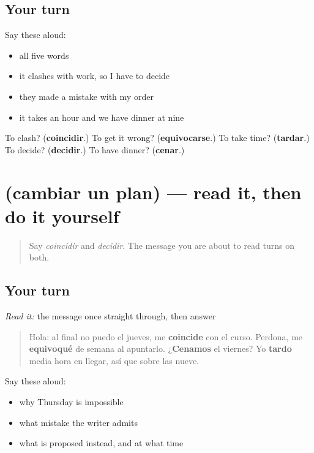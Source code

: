 \subsection*{Your turn}
Say these aloud:

\begin{itemize}
\raggedright
  \item all five words
  \item it clashes with work, so I have to decide
  \item they made a mistake with my order
  \item it takes an hour and we have dinner at nine
\end{itemize}

\begin{tcolorbox}[breakable,colback=teal!4,colframe=teal!35!black,title={Before you move on}]
To clash? (\textbf{coincidir}.) To get it wrong? (\textbf{equivocarse}.) To take time? (\textbf{tardar}.) To decide? (\textbf{decidir}.) To have dinner? (\textbf{cenar}.)
\end{tcolorbox}
\section[Practice]{(cambiar un plan) — read it, then do it yourself}

\label{lesson:ES-C437-sintesis-plan}



\begin{quote}
Say \emph{coincidir} and \emph{decidir}. The message you are about to read turns on both.
\end{quote}

\subsection*{Your turn}
\emph{Read it:} the message once straight through, then answer

\begin{quote}
Hola: al final no puedo el jueves, me \textbf{coincide} con el curso. Perdona, me \textbf{equivoqué} de semana al apuntarlo. ¿\textbf{Cenamos} el viernes? Yo \textbf{tardo} media hora en llegar, así que sobre las nueve.
\end{quote}

Say these aloud:

\begin{itemize}
\raggedright
  \item why Thursday is impossible
  \item what mistake the writer admits
  \item what is proposed instead, and at what time
\end{itemize}

